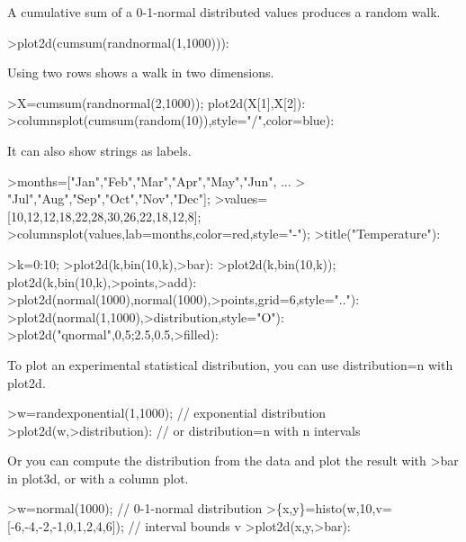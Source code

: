 \documentclass{article}
\begin{document}
\begin{eulernotebook}
\begin{eulercomment}
\begin{eulercomment}
\begin{eulercomment}
\begin{eulercomment}
\begin{eulercomment}
\begin{eulercomment}
\begin{eulercomment}
A cumulative sum of a 0-1-normal distributed values produces a random walk.
\end{eulercomment}
\begin{eulerprompt}
>plot2d(cumsum(randnormal(1,1000))):
\end{eulerprompt}
\begin{eulercomment}
Using two rows shows a walk in two dimensions.
\end{eulercomment}
\begin{eulerprompt}
>X=cumsum(randnormal(2,1000)); plot2d(X[1],X[2]):
>columnsplot(cumsum(random(10)),style="/",color=blue):
\end{eulerprompt}
\begin{eulercomment}
It can also show strings as labels.
\end{eulercomment}
\begin{eulerprompt}
>months=["Jan","Feb","Mar","Apr","May","Jun", ...
>  "Jul","Aug","Sep","Oct","Nov","Dec"];
>values=[10,12,12,18,22,28,30,26,22,18,12,8];
>columnsplot(values,lab=months,color=red,style="-");
>title("Temperature"):
\end{eulerprompt}
\begin{eulerprompt}
>k=0:10;
>plot2d(k,bin(10,k),>bar):
>plot2d(k,bin(10,k)); plot2d(k,bin(10,k),>points,>add):
>plot2d(normal(1000),normal(1000),>points,grid=6,style=".."):
>plot2d(normal(1,1000),>distribution,style="O"):
>plot2d("qnormal",0,5;2.5,0.5,>filled):
\end{eulerprompt}
\begin{eulercomment}
To plot an experimental statistical distribution, you can use distribution=n with
plot2d.
\end{eulercomment}
\begin{eulerprompt}
>w=randexponential(1,1000); // exponential distribution
>plot2d(w,>distribution): // or distribution=n with n intervals
\end{eulerprompt}
\begin{eulercomment}
Or you can compute the distribution from the data and plot the result with \textgreater{}bar in
plot3d, or with a column plot.
\end{eulercomment}
\begin{eulerprompt}
>w=normal(1000); // 0-1-normal distribution
>\{x,y\}=histo(w,10,v=[-6,-4,-2,-1,0,1,2,4,6]); // interval bounds v
>plot2d(x,y,>bar):
\end{eulerprompt}
\begin{eulercomment}

\end{eulercomment}
\end{eulercomment}
\end{eulercomment}
\end{eulercomment}
\end{eulercomment}
\end{eulercomment}
\end{eulercomment}
\end{eulernotebook}
\end{document}
